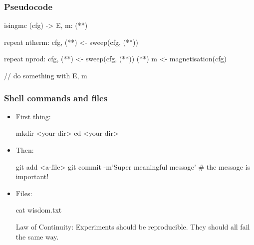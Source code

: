 \documentclass[mathserif, fleqn, aspectratio=169]{beamer}
\begin{document}
\begin{frame}[fragile]\frametitle{Pseudocode}
  \begin{aiphipseudo}[emph={isingmc}, caption={Some MC pseudocode}]
isingmc (cfg) -> E, m:
    (**)

    repeat ntherm:
        cfg, (**) <- sweep(cfg, (**))

    repeat nprod:
        cfg, (**) <- sweep(cfg, (**))
        (**)
        m <- magnetisation(cfg)

        // do something with E, m
  \end{aiphipseudo}
\end{frame}

\begin{frame}[fragile]\frametitle{Shell commands and files}
  \begin{itemize}
  \item First thing:
    \begin{shell}[]
mkdir <your-dir>
cd <your-dir>
    \end{shell}
  \item Then:
    \begin{shell}[]
git add <a-file>
git commit -m'Super meaningful message'  # the message is important!
    \end{shell}
  \item Files:
    \begin{shell}[]
cat wisdom.txt
    \end{shell}
    \begin{file}[]
Law of Continuity:
    Experiments should be reproducible.  They should all fail the same way.
    \end{file}
  \end{itemize}
\end{frame}
\end{document}
